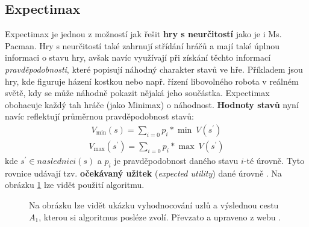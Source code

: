 \subsection*{Expectimax}
Expectimax \cite{mas} je jednou z možností jak řešit \textbf{hry s neurčitostí} jako je i Ms. Pacman. Hry s neurčitostí také zahrnují střídání hráčů a mají také úplnou informaci o stavu hry, avšak navíc využívají při získání těchto informací \textit{pravděpodobnosti}, které popisují náhodný charakter stavů ve hře. Příkladem jsou hry, kde figuruje házení kostkou nebo např. řízení libovolného robota v reálném světě, kdy se může náhodně pokazit nějaká jeho součástka. Expectimax obohacuje každý tah hráče (jako Minimax) o náhodnost. \textbf{Hodnoty stavů} nyní navíc reflektují průměrnou pravděpodobnost stavů:
\begin{align}
V_{\min}(s) = \sum_{i=0} p_i * \min \: V(s^\prime)
\end{align}
\begin{align}
V_{\max}(s^\prime) = \sum_{i=0} p_i * \max \: V(s^\prime)
\end{align}
kde $s^\prime \in naslednici(s)$ a $p_i$ je pravděpodobnost daného stavu $i$-té úrovně.
\newline
Tyto rovnice udávají tzv. \textbf{očekávaný užitek} (\textit{expected utility}) dané úrovně \cite{mas}. Na obrázku \ref{img:expectimax} lze vidět použití algoritmu.
\newpage

\begin{figure}[!htbp]
\begin{center}
  \caption[]{Na obrázku lze vidět ukázku vyhodnocování uzlů a výslednou cestu $A_1$, kterou si algoritmus posléze zvolí. Převzato a upraveno z webu \footnotemark{}.}
  \label{img:expectimax}
\end{center}
\end{figure}

